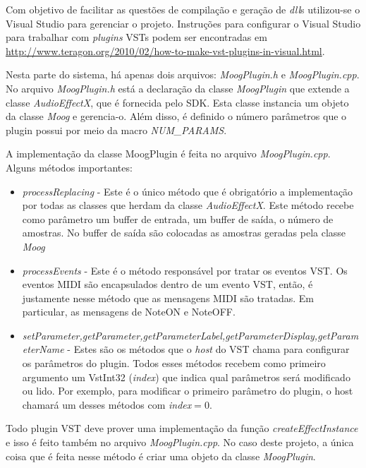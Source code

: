 \documentclass{article}
\begin{document}
Com objetivo de facilitar as questões de compilação e geração de \emph{dll}s 
utilizou-se o Visual Studio para gerenciar o projeto. Instruções para configurar 
o Visual Studio para trabalhar com \emph{plugins} VSTs podem ser encontradas em 
\url{http://www.teragon.org/2010/02/how-to-make-vst-plugins-in-visual.html}.

Nesta parte do sistema, há apenas dois arquivos: \emph{MoogPlugin.h} e \emph{MoogPlugin.cpp}.
No arquivo \emph{MoogPlugin.h} está a declaração da classe \emph{MoogPlugin} que 
extende a classe \emph{AudioEffectX}, que é fornecida pelo SDK. Esta classe instancia 
um objeto da classe \emph{Moog} e gerencia-o. Além disso, é 
definido o número parâmetros que o plugin possui por meio da macro \emph{NUM\_PARAMS}.

A implementação da classe MoogPlugin é feita no arquivo \emph{MoogPlugin.cpp}. Alguns 
métodos importantes:

\begin{itemize}
	\item \emph{processReplacing} - Este é o único método que é obrigatório a implementação 
	por todas as classes que herdam da classe \emph{AudioEffectX}. Este método recebe como parâmetro 
	um buffer de entrada, um buffer de saída, o número de amostras. No buffer de saída são colocadas 
	as amostras geradas pela classe \emph{Moog}
	\item \emph{processEvents} - Este é o método responsável por tratar os eventos VST. 
	Os eventos MIDI são encapsulados dentro de um evento VST, então, é justamente nesse 
	método que as mensagens MIDI são tratadas. Em particular, as mensagens de NoteON e 
	NoteOFF.
	\item \emph{setParameter,getParameter,getParameterLabel,getParameterDisplay,getParameterName} - 
	Estes são os métodos que o \emph{host} do VST chama para configurar os parâmetros do plugin. 
	Todos esses métodos recebem como primeiro argumento um VstInt32 (\emph{index}) que indica qual 
	parâmetros será modificado ou lido. Por exemplo, para modificar o primeiro parâmetro 
	do plugin, o host chamará um desses métodos com \emph{index}$=0$.
\end{itemize}

Todo plugin VST deve prover uma implementação da função \emph{createEffectInstance} e isso 
é feito também no arquivo \emph{MoogPlugin.cpp}. No caso deste projeto, a única coisa 
que é feita nesse método é criar uma objeto da classe \emph{MoogPlugin}. 




\end{document}
